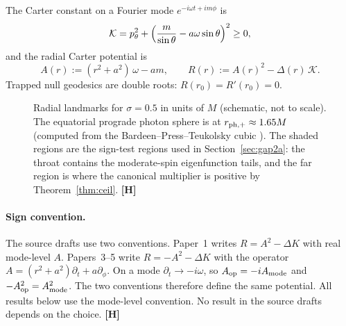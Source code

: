 \documentclass[11pt,a4paper]{article}
\newcommand{\VH}{\textcolor{vh}{\textbf{[H]}}}
\theoremstyle{remark}
\theoremstyle{definition}
\begin{document}
The Carter constant on a Fourier mode $e^{-i\omega t + im\phi}$ is
\[
\mathcal{K} = p_\theta^2 + \Bigl(\frac{m}{\sin\theta} - a\omega\sin\theta\Bigr)^2 \ge 0,
\]
and the radial Carter potential is
\[
A(r) := (r^2+a^2)\,\omega - a m, \qquad R(r) := A(r)^2 - \Delta(r)\,\mathcal{K}.
\]
Trapped null geodesics are double roots: $R(r_0) = R'(r_0) = 0$.

\begin{figure}[H]
\centering
{}
\caption{Radial landmarks for $\sigma = 0.5$ in units of $M$ (schematic, not to scale). The equatorial prograde photon sphere is at $r_{{\rm ph},+}\approx 1.65M$ (computed from the Bardeen--Press--Teukolsky cubic \cite{BardeenPressTeukolsky1972}). The shaded regions are the sign-test regions used in Section~\ref{sec:gap2a}: the throat contains the moderate-spin eigenfunction tails, and the far region is where the canonical multiplier is positive by Theorem~\ref{thm:ceil}. \VH}
\label{fig:landmarks}
\end{figure}

\paragraph{Sign convention.} The source drafts use two conventions. Paper~1 writes $R = A^2 - \Delta K$ with real mode-level $A$. Papers~3--5 write $R = -A^2 - \Delta K$ with the operator $A = (r^2+a^2)\partial_t + a\partial_\phi$. On a mode $\partial_t \to -i\omega$, so $A_{\rm op} = -iA_{\rm mode}$ and $-A_{\rm op}^2 = A_{\rm mode}^2$. The two conventions therefore define the same potential. All results below use the mode-level convention. No result in the source drafts depends on the choice. \VH
\end{document}
